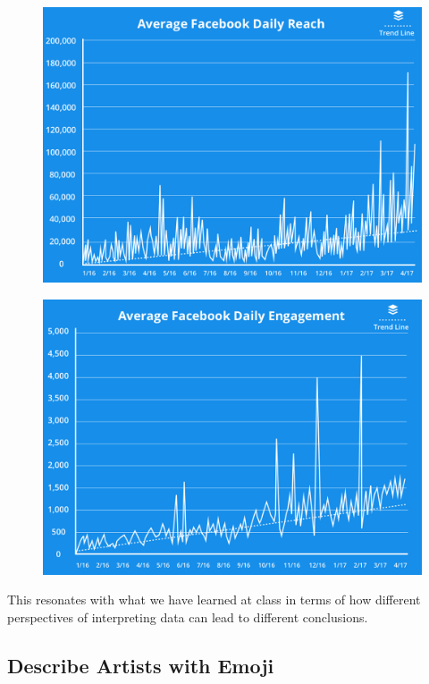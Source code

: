 \documentclass[]{book}
\theoremstyle{definition}
\theoremstyle{definition}
\theoremstyle{definition}
\theoremstyle{remark}
\begin{document}
\begin{figure}
\centering
\includegraphics{images/average-facebook-reach.png}
\caption{}
\end{figure}

\begin{figure}
\centering
\includegraphics{images/average-facebook-daily-reach.png}
\caption{}
\end{figure}

This resonates with what we have learned at class in terms of how
different perspectives of interpreting data can lead to different
conclusions.

\subsection{Describe Artists with
Emoji}\label{describe-artists-with-emoji}
\end{document}
